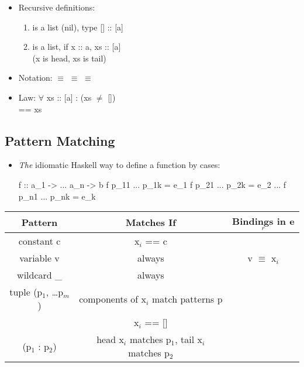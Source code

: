 \begin{itemize}
  \item Recursive definitions:
  \begin{enumerate}
      \item \codeline{[]} is a list (nil), type [] :: [a]
      \item {} is a list, if x :: a, xs :: [a] \\ (x is head, xs is tail)
  \end{enumerate}
  \item Notation:  $\equiv$  $\equiv$ \codeline{[3,2,1]} $\equiv$ 
  \item Law: $\forall$ xs :: [a] :   \hspace{1cm} (xs $\neq$ []) \\
       == xs
\end{itemize}




\subsection{Pattern Matching}

\begin{itemize}
  \item \textit{The} idiomatic Haskell way to define a function by cases:
  \begin{codebox}[haskell]
f :: a_1 -> ... a_n -> b
f p_11 ... p_1k = e_1
f p_21 ... p_2k = e_2
...
f p_n1 ... p_nk = e_k
  \end{codebox}

\end{itemize}

\vspace{9pt}\begin{center}\begin{tabular}{|c|c|c|}\hline
\rowcolor{grau}   Pattern         & Matches If                & Bindings in e$_r$     \\\hline
                  constant c      & x$_i$ == c                  &                     \\\hline
                  variable v      & always                    & v $\equiv$ x$_i$      \\\hline
                  wildcard \_      & always                    &                       \\\hline
                  tuple (p$_1$, \dots p$_m$)  & components of x$_i$ match patterns p    & \\\hline
                  []              & x$_i$ == []                 &                     \\\hline
                  (p$_1$ : p$_2$)     & head x$_i$ matches p$_1$, tail x$_i$ matches p$_2$    & \\\hline
\end{tabular}\end{center}\vspace{9pt}










